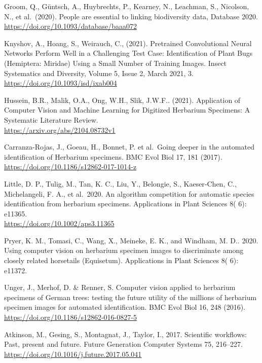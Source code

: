 \begin{thebibliography}{9}
Groom, Q., Güntsch, A., Huybrechts, P., Kearney, N., Leachman,
S., Nicolson, N., et al.~(2020). People are essential to linking
biodiversity data, Database 2020.\\
\url{https://doi.org/10.1093/database/baaa072}

Knyshov, A., Hoang, S., Weirauch, C., (2021). Pretrained
Convolutional Neural Networks Perform Well in a Challenging Test Case:
Identification of Plant Bugs (Hemiptera: Miridae) Using a Small Number
of Training Images. Insect Systematics and Diversity, Volume 5, Issue 2,
March 2021, 3.\\
\url{https://doi.org/10.1093/isd/ixab004}

Hussein, B.R., Malik, O.A., Ong, W.H., Slik, J.W.F.. (2021).
Application of Computer Vision and Machine Learning for Digitized
Herbarium Specimens: A Systematic Literature Review.\\
\url{https://arxiv.org/abs/2104.08732v1}

Carranza-Rojas, J., Goeau, H., Bonnet, P. et al.~Going deeper
in the automated identification of Herbarium specimens. BMC Evol Biol
17, 181 (2017).\\
\url{https://doi.org/10.1186/s12862-017-1014-z}

Little, D. P., Tulig, M., Tan, K. C., Liu, Y., Belongie, S.,
Kaeser‐Chen, C., Michelangeli, F. A., et al.~2020. An algorithm
competition for automatic species identification from herbarium
specimens. Applications in Plant Sciences 8( 6): e11365.\\
\url{https://doi.org/10.1002/aps3.11365}

Pryer, K. M., Tomasi, C., Wang, X., Meineke, E. K., and
Windham, M. D.. 2020. Using computer vision on herbarium specimen images
to discriminate among closely related horsetails (Equisetum).
Applications in Plant Sciences 8( 6): e11372.

Unger, J., Merhof, D. \& Renner, S. Computer vision applied to
herbarium specimens of German trees: testing the future utility of the
millions of herbarium specimen images for automated identification. BMC
Evol Biol 16, 248 (2016).\\
\url{https://doi.org/10.1186/s12862-016-0827-5}

Atkinson, M., Gesing, S., Montagnat, J., Taylor, I., 2017.
Scientific workflows: Past, present and future. Future Generation
Computer Systems 75, 216--227.\\
\url{https://doi.org/10.1016/j.future.2017.05.041}


\end{thebibliography}
